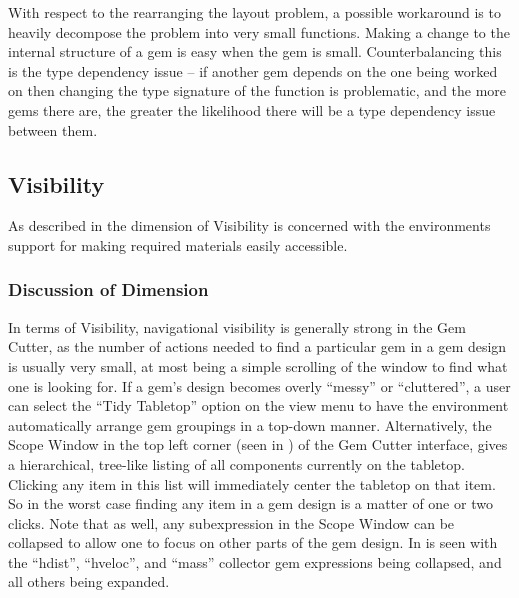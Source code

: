 With respect to the rearranging the layout problem, a possible workaround is to heavily decompose the problem into very small functions.  Making a change to the internal structure of a gem is easy when the gem is small.  Counterbalancing this is the type dependency issue -- if another gem depends on the one being worked on then changing the type signature of the function is problematic, and the more gems there are, the greater the likelihood there will be a type dependency issue between them.


\subsection{Visibility}

As described in  the dimension of Visibility is concerned with the environments support for making required materials easily accessible.

\subsubsection{Discussion of Dimension}

In terms of Visibility, navigational visibility is generally strong in the Gem Cutter, as the number of actions needed to find a particular gem in a gem design is usually very small, at most being a simple scrolling of the window to find what one is looking for.  If a gem's design becomes overly ``messy'' or ``cluttered'', a user can select the ``Tidy Tabletop'' option on the view menu to have the environment automatically arrange gem groupings in a top-down manner.  Alternatively, the Scope Window in the top left corner (seen in ) of the Gem Cutter interface, gives a hierarchical, tree-like listing of all components currently on the tabletop.  Clicking any item in this list will immediately center the tabletop on that item.  So in the worst case finding any item in a gem design is a matter of one or two clicks.  Note that as well, any subexpression in the Scope Window can be collapsed to allow one to focus on other parts of the gem design.  In  is seen with the ``hdist'', ``hveloc'', and ``mass'' collector gem expressions being collapsed, and all others being expanded.  


